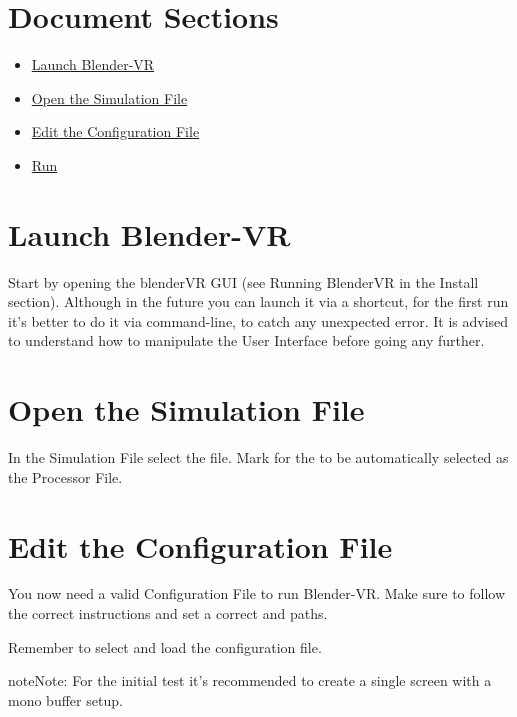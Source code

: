 \documentclass[a4,10pt,openany,oneside]{sphinxmanual}
\begin{document}
\section{Document Sections}
\label{first-run:document-sections}\begin{itemize}
\item {} 
{\hyperref[first-run:launch-blender-vr]{Launch Blender-VR}}

\item {} 
{\hyperref[first-run:open-the-simulation-file]{Open the Simulation File}}

\item {} 
{\hyperref[first-run:edit-the-configuration-file]{Edit the Configuration File}}

\item {} 
{\hyperref[first-run:run]{Run}}

\end{itemize}


\section{Launch Blender-VR}
\label{first-run:launch-blender-vr}
Start by opening the blenderVR GUI (see Running BlenderVR in the Install section). Although in the future you can launch it via a shortcut, for the first run it's better to do it via command-line, to catch any unexpected error.
It is advised to understand how to manipulate the User Interface before going any further.


\section{Open the Simulation File}
\label{first-run:open-the-simulation-file}
In the Simulation File select the  file. Mark  for the  to be automatically selected as the Processor File.


\section{Edit the Configuration File}
\label{first-run:edit-the-configuration-file}
You now need a valid Configuration File to run Blender-VR. Make sure to follow the correct instructions and set a correct  and  paths.

Remember to select and load the configuration file.

\begin{notice}{note}{Note:}
For the initial test it's recommended to create a single screen with a mono buffer setup.
\end{notice}
\end{document}

